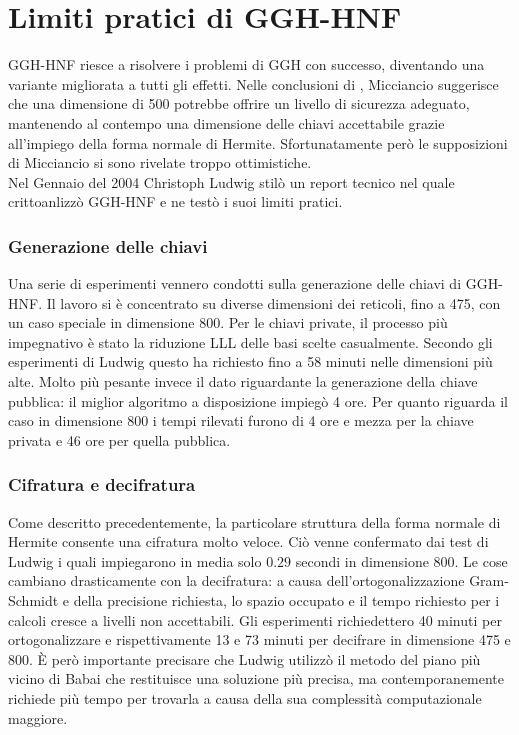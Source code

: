\section{Limiti pratici di GGH-HNF}
\label{sec:HNFLimits}
GGH-HNF riesce a risolvere i problemi di GGH con successo, diventando una variante migliorata
a tutti gli effetti. Nelle conclusioni di \cite{HNF01}, Micciancio suggerisce che una dimensione di 
500 potrebbe offrire un livello di sicurezza adeguato, mantenendo al contempo una dimensione delle 
chiavi accettabile grazie all'impiego della forma normale di Hermite. Sfortunatamente però le 
supposizioni di Micciancio si sono rivelate troppo ottimistiche. \\
Nel Gennaio del 2004 Christoph Ludwig stilò un report tecnico \cite{HNF04} nel quale crittoanlizzò
GGH-HNF e ne testò i suoi limiti pratici. 

\subsubsection{Generazione delle chiavi}
Una serie di esperimenti vennero condotti sulla generazione delle chiavi di GGH-HNF.
Il lavoro si è concentrato su diverse dimensioni dei reticoli, fino a 475, 
con un caso speciale in dimensione 800.
Per le chiavi private, il processo più impegnativo è stato la riduzione LLL delle basi scelte 
casualmente. Secondo gli esperimenti di Ludwig questo ha richiesto fino a 58 minuti nelle dimensioni più alte.
Molto più pesante invece il dato riguardante la generazione della chiave pubblica: il miglior algoritmo
a disposizione impiegò 4 ore. Per quanto riguarda il caso in dimensione 800 i tempi rilevati furono
di 4 ore e mezza per la chiave privata e 46 ore per quella pubblica.

\subsubsection{Cifratura e decifratura}
Come descritto precedentemente, la particolare struttura della forma normale di Hermite consente una
cifratura molto veloce. Ciò venne confermato dai test di Ludwig i quali impiegarono in media solo $0.29$
secondi in dimensione 800. Le cose cambiano drasticamente con la decifratura: a causa dell'ortogonalizzazione
Gram-Schmidt e della precisione richiesta, lo spazio occupato e il tempo richiesto per i calcoli
cresce a livelli non accettabili. Gli esperimenti richiedettero 40 minuti per ortogonalizzare
e rispettivamente 13 e 73 minuti per decifrare in dimensione 475 e 800. È però importante precisare
che Ludwig utilizzò il metodo del piano più vicino di Babai che restituisce una soluzione più precisa, 
ma contemporanemente richiede più tempo per trovarla a causa della sua complessità computazionale maggiore. 

